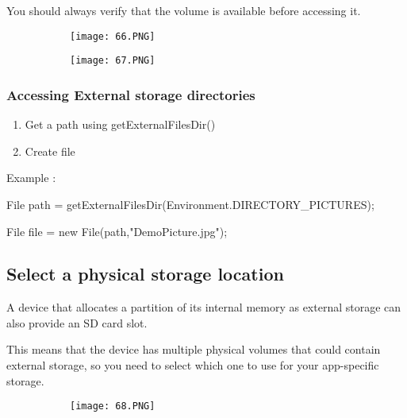 \documentclass{article}
\begin{document}
You should always verify that the volume is available before accessing it.

  \begin{figure}[ht!]
  \centering
  \begin{subfigure}[b]{.7\linewidth}
  \texttt{[image: 66.PNG]}
  \end{subfigure}
  \end{figure}


  
  \begin{figure}[ht!]
  \centering
  \begin{subfigure}[b]{.7\linewidth}
  \texttt{[image: 67.PNG]}
  \end{subfigure}
  \end{figure}


\subsubsection{Accessing External storage directories}

\begin{enumerate}
    \item Get a path using getExternalFilesDir()
    \item Create file
\end{enumerate}

Example :

File path = getExternalFilesDir(Environment.DIRECTORY\_PICTURES);

File file = new File(path,"DemoPicture.jpg");


\subsection{Select a physical storage location}

A device that allocates a partition of its internal memory as external storage can also provide an SD card slot.

This means that the device has multiple physical volumes that could contain external storage, so you need to select which one to use for your app-specific storage.

\begin{figure}[ht!]
  \centering
  \begin{subfigure}[b]{1\linewidth}
  \texttt{[image: 68.PNG]}
  \end{subfigure}
  \end{figure}
\end{document}

